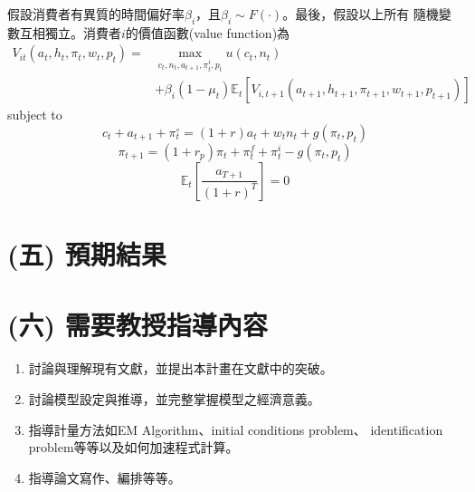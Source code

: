 \documentclass[12pt]{article}
\begin{document}
\begin{CJK*}{UTF8}{bkai}
假設消費者有異質的時間偏好率$\beta_i$，且$\beta_i \sim F(\cdot)$。最後，假設以上所有
隨機變數互相獨立。消費者$i$的價值函數(value function)為
\begin{equation}
    \begin{split}
        V_{it}(a_t,h_t,\pi_t,w_t,p_t) = &\max_{c_t,n_t,a_{t+1},\pi^i_t,p_t} u(c_t,n_t) \\
        &+ \beta_i (1-\mu_t) \mathbb{E}_t[V_{i,t+1}(a_{t+1},h_{t+1},\pi_{t+1},w_{t+1},p_{t+1})]
    \end{split}
\end{equation}
subject to
\begin{equation}
    c_t + a_{t+1} + \pi^\circ_t = (1+r)a_t + w_t n_t + g(\pi_t,p_t)
\end{equation}
\begin{equation}
    \pi_{t+1} = (1+r_p) \pi_t + \pi^f_t + \pi^i_t - g(\pi_t,p_t)
\end{equation}
\begin{equation}
    \mathbb{E}_t[\frac{a_{T+1}}{(1+r)^T}] = 0
\end{equation}

\subsection*{}

\section*{\normalfont(五) 預期結果}

\section*{\normalfont(六) 需要教授指導內容}
\begin{enumerate}
    \item 討論與理解現有文獻，並提出本計畫在文獻中的突破。
    \item 討論模型設定與推導，並完整掌握模型之經濟意義。
    \item 指導計量方法如EM Algorithm、initial conditions problem、
    identification problem等等以及如何加速程式計算。
    \item 指導論文寫作、編排等等。
\end{enumerate}



\end{CJK*}
\end{document}
